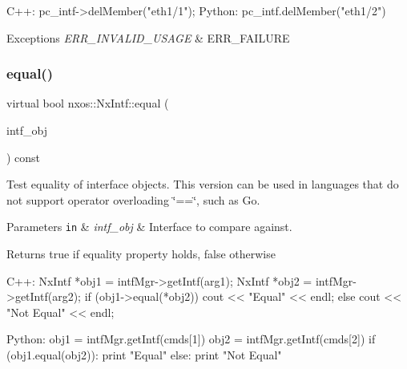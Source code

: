 \begin{DoxyCode}
C++:
    pc\_intf->delMember(\textcolor{stringliteral}{"eth1/1"});
Python:
    pc\_intf.delMember(\textcolor{stringliteral}{"eth1/2"})
\end{DoxyCode}



\begin{DoxyExceptions}{Exceptions}
{\em E\+R\+R\+\_\+\+I\+N\+V\+A\+L\+I\+D\+\_\+\+U\+S\+A\+GE} & E\+R\+R\+\_\+\+F\+A\+I\+L\+U\+RE \\
\hline
\end{DoxyExceptions}
\mbox{\label{classnxos_1_1_nx_intf_a3121854504b3d9828f75e3d47f50d7f8}} 
\subsubsection{\texorpdfstring{equal()}{equal()}}
{\footnotesize\ttfamily virtual bool nxos\+::\+Nx\+Intf\+::equal (\begin{DoxyParamCaption}\item[{\mbox{\hyperlink{classnxos_1_1_nx_intf}{Nx\+Intf}} const \&}]{intf\+\_\+obj }\end{DoxyParamCaption}) const\hspace{0.3cm}{\ttfamily [pure virtual]}}

Test equality of interface objects. This version can be used in languages that do not support operator overloading \char`\"{}==\char`\"{}, such as Go. 
\begin{DoxyParams}[1]{Parameters}
\mbox{\tt in}  & {\em intf\+\_\+obj} & Interface to compare against. \\
\hline
\end{DoxyParams}
\begin{DoxyReturn}{Returns}
true if equality property holds, false otherwise
\end{DoxyReturn}

\begin{DoxyCode}
C++:
     NxIntf *obj1 = intfMgr->getIntf(arg1);
     NxIntf *obj2 = intfMgr->getIntf(arg2);
         \textcolor{keywordflow}{if} (obj1->equal(*obj2))
             cout << \textcolor{stringliteral}{"Equal"} << endl;
         \textcolor{keywordflow}{else}
             cout << \textcolor{stringliteral}{"Not Equal"} << endl;

Python:
    obj1 = intfMgr.getIntf(cmds[1])
    obj2 = intfMgr.getIntf(cmds[2])
    \textcolor{keywordflow}{if} (obj1.equal(obj2)):
        print \textcolor{stringliteral}{"Equal"}
    \textcolor{keywordflow}{else}:
        print \textcolor{stringliteral}{"Not Equal"}
\end{DoxyCode}



